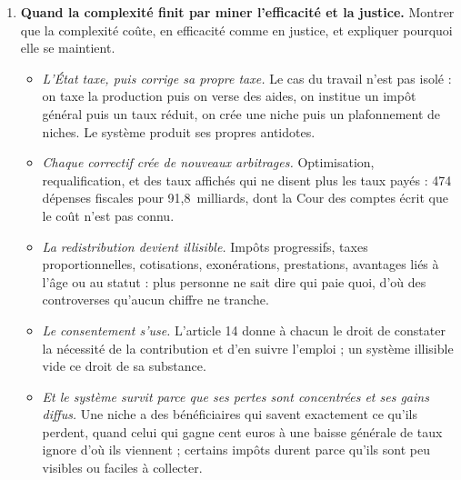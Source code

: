 \documentclass[11pt,a4paper]{article}
\newenvironment{chapitres}[1]
{\begin{enumerate}[leftmargin=1.6em,itemsep=0.15em,parsep=0pt,topsep=0.20em,start=#1]}
{\end{enumerate}}
\newenvironment{args}
{\begin{itemize}[leftmargin=1.1em,itemsep=0.1em,parsep=0pt,topsep=0.12em,label=\textbullet]}
{\end{itemize}}
\begin{document}
\begin{chapitres}{4}
\begin{args}
mal que 45.
\item \emph{L'euro suivant est le plus taxé au bas de l'échelle des salaires.} Un célibataire sans
enfant est prélevé à 64,6~\% autour de 67~\% du salaire moyen, contre 58,2~\% au salaire moyen.
\item \emph{La production est taxée avant le profit.} 77~milliards sont dus même quand l'entreprise
perd de l'argent, à rebours de la règle qui commande de ne pas taxer les intrants.
\item \emph{L'épargne est taxée selon son enveloppe, et le sol sur une photographie de 1970.} Le même
rendement est imposé de 0 à 55~\% selon le support ; la taxe foncière des logements repose toujours
sur les valeurs locatives de 1970.
\item \emph{Au total, la structure est presque à l'envers du classement de l'OCDE.} 25,9 points de PIB
dans l'avant-dernière catégorie contre 17,5 en moyenne, et le seul prélèvement inférieur à la
moyenne porte sur la catégorie jugée la plus nocive.
\end{args}
\item \textbf{Quand la complexité finit par miner l'efficacité et la justice.} Montrer que la
complexité coûte, en efficacité comme en justice, et expliquer pourquoi elle se maintient.
\begin{args}
\item \emph{L'État taxe, puis corrige sa propre taxe.} Le cas du travail n'est pas isolé : on taxe la
production puis on verse des aides, on institue un impôt général puis un taux réduit, on crée une
niche puis un plafonnement de niches. Le système produit ses propres
antidotes.
\item \emph{Chaque correctif crée de nouveaux arbitrages.} Optimisation, requalification, et des taux
affichés qui ne disent plus les taux payés : 474 dépenses fiscales pour 91,8~milliards, dont la Cour
des comptes écrit que le coût n'est pas connu.
\item \emph{La redistribution devient illisible.} Impôts progressifs, taxes proportionnelles,
cotisations, exonérations, prestations, avantages liés à l'âge ou au statut : plus personne ne sait
dire qui paie quoi, d'où des controverses qu'aucun chiffre ne tranche.
\item \emph{Le consentement s'use.} L'article 14 donne à chacun le droit de constater la nécessité de
la contribution et d'en suivre l'emploi ; un système illisible vide ce droit de sa substance.
\item \emph{Et le système survit parce que ses pertes sont concentrées et ses gains diffus.} Une niche
a des bénéficiaires qui savent exactement ce qu'ils perdent, quand celui qui gagne cent euros à une
baisse générale de taux ignore d'où ils viennent ; certains impôts durent parce qu'ils sont peu
visibles ou faciles à collecter.
\end{args}
\end{chapitres}
\end{document}
